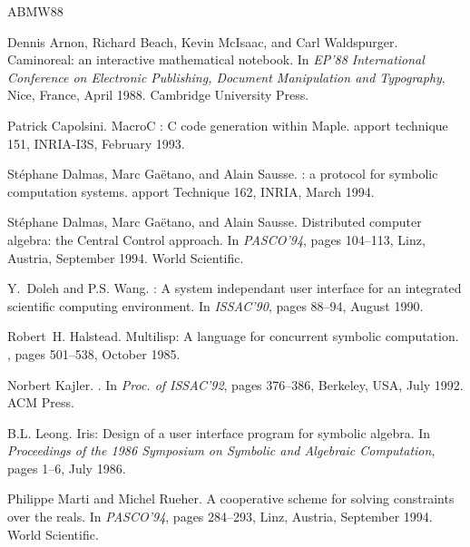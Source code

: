 \documentclass {article}
\begin{document}
%
%
\begin{thebibliography}{ABMW88}

Dennis Arnon, Richard Beach, Kevin McIsaac, and Carl Waldspurger.
\newblock Caminoreal: an interactive mathematical notebook.
\newblock In {\em EP'88 International Conference on Electronic Publishing,
  Document Manipulation and Typography}, Nice, France, April 1988. Cambridge
  University Press.

Patrick Capolsini.
\newblock Macro{C} : {C} code generation within {M}aple.
apport technique 151, INRIA-I3S, February 1993.

St\'ephane Dalmas, Marc Ga{\"e}tano, and Alain Sausse.
 : a protocol for symbolic computation systems.
apport Technique 162, INRIA, March 1994.

St\'ephane Dalmas, Marc Ga\"etano, and Alain Sausse.
\newblock Distributed computer algebra: the {C}entral {C}ontrol approach.
\newblock In {\em PASCO'94}, pages 104--113, Linz, Austria, September 1994.
  World Scientific.

Y.~Doleh and P.S. Wang.
 : A system independant user interface for an integrated
  scientific computing environment.
\newblock In {\em ISSAC'90}, pages 88--94, August 1990.

Robert~H. Halstead.
\newblock Multilisp: A language for concurrent symbolic computation.
, pages
  501--538, October 1985.

Norbert Kajler.
.
\newblock In {\em {Proc. of ISSAC'92}}, pages 376--386, Berkeley, USA, July
  1992. {ACM Press}.

B.L. Leong.
\newblock Iris: Design of a user interface program for symbolic algebra.
\newblock In {\em Proceedings of the 1986 Symposium on Symbolic and Algebraic
  Computation}, pages 1--6, July 1986.

Philippe Marti and Michel Rueher.
\newblock A cooperative scheme for solving constraints over the reals.
\newblock In {\em PASCO'94}, pages 284--293, Linz, Austria, September 1994.
  World Scientific.


\end{thebibliography}
\end{document}
